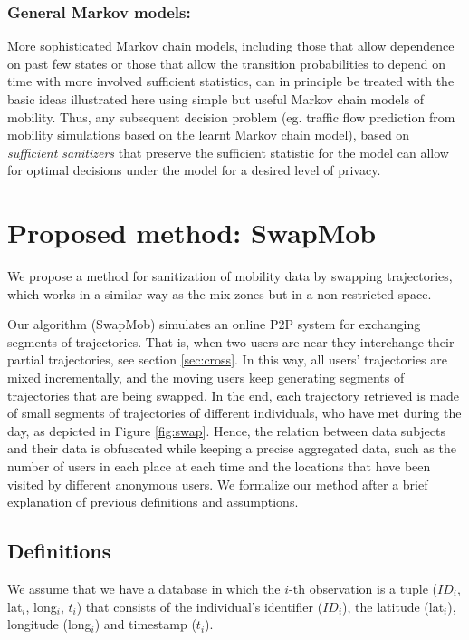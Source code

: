 \subsubsection{General Markov models:}
More sophisticated Markov chain models, including those that allow dependence on past few states or those that allow the transition probabilities to depend on time with more involved sufficient statistics, can in principle be treated with the basic ideas illustrated here using simple but useful Markov chain models of mobility. 
Thus, any subsequent decision problem (eg. traffic flow prediction from mobility simulations based on the learnt Markov chain model), based on {\em sufficient sanitizers} that preserve the sufficient statistic for the model can allow for optimal decisions under the model for a desired level of privacy. 


\section{Proposed method: SwapMob}\label{Sec:swapmob}

We propose a method for sanitization of mobility data by swapping trajectories, which works in a similar way as the mix zones but in a non-restricted space.


Our algorithm (SwapMob) simulates an online P2P system for exchanging segments of trajectories. That is, when two users are near they interchange their partial trajectories, see section \ref{sec:cross}.
In this way, all users' trajectories are mixed incrementally, and the moving users keep generating segments of trajectories that are being swapped. In the end, each trajectory retrieved is made of small segments of trajectories of different individuals, who have met during the day, as depicted in Figure \ref{fig:swap}. Hence, the relation between data subjects and their data is obfuscated while keeping a precise aggregated data, such as the number of users in each place at each time and the locations that have been visited by different anonymous users.  
We formalize our method after a brief explanation of previous definitions and assumptions.

\subsection{Definitions}
We assume that we have a database in which the $i$-th observation is a tuple ($ID_i$, lat$_i$, long$_i$, $t_i$) that
consists of the individual's identifier ($ID_i$), the latitude (lat$_i$), longitude (long$_i$) and timestamp ($t_i$).

